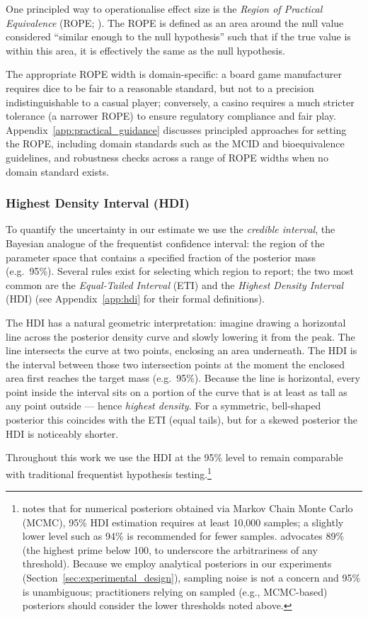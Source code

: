 One principled way to operationalise effect size is the
\textit{Region of Practical Equivalence} (ROPE; \citealt{kruschke2011}).
The ROPE is defined as an area around the null value considered ``similar enough to the null hypothesis''
such that if the true value is within this area, it is effectively the same as the null hypothesis.

The appropriate ROPE width is domain-specific: a board game manufacturer requires
dice to be fair to a reasonable standard, but not to a precision indistinguishable
to a casual player; conversely, a casino requires a much stricter tolerance (a narrower
ROPE) to ensure regulatory compliance and fair play.
Appendix~\ref{app:practical_guidance} discusses principled approaches for setting
the ROPE, including domain standards such as the MCID and bioequivalence guidelines,
and robustness checks across a range of ROPE widths when no domain standard exists.

\subsubsection{Highest Density Interval (HDI)}\label{sec:precision_hdi}

To quantify the uncertainty in our estimate we use the \textit{credible interval},
the Bayesian analogue of the frequentist confidence interval:
the region of the parameter space that contains a specified fraction of the posterior mass
(e.g.\ 95\%).
Several rules exist for selecting which region to report; the two most common are the
\textit{Equal-Tailed Interval} (ETI) and the \textit{Highest Density Interval} (HDI)
(see Appendix~\ref{app:hdi} for their formal definitions).


The HDI has a natural geometric interpretation: imagine drawing a horizontal line across
the posterior density curve and slowly lowering it from the peak. The line intersects the
curve at two points, enclosing an area underneath. The HDI is the interval between those
two intersection points at the moment the enclosed area first reaches the target mass
(e.g.\ 95\%). Because the line is horizontal, every point inside the interval sits on a
portion of the curve that is at least as tall as any point outside — hence \textit{highest
density}. For a symmetric, bell-shaped posterior this coincides with the ETI (equal tails),
but for a skewed posterior the HDI is noticeably shorter.

Throughout this work we use the HDI at the 95\% level to remain comparable with traditional
frequentist hypothesis testing.\footnote{\cite{kruschke2015doing} notes that for numerical posteriors
obtained via Markov Chain Monte Carlo (MCMC), 95\% HDI estimation requires at least 10{,}000 samples; a slightly lower
level such as 94\% is recommended for fewer samples. \cite{mcelreath2016} advocates 89\%
(the highest prime below 100, to underscore the arbitrariness of any threshold). Because we employ analytical
posteriors in our experiments (Section~\ref{sec:experimental_design}), sampling noise is not a
concern and 95\% is unambiguous; practitioners relying on sampled (e.g., MCMC-based) posteriors
should consider the lower thresholds noted above.}

